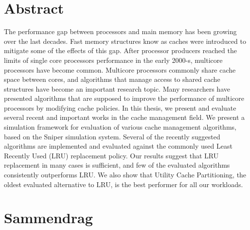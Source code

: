 
\section*{Abstract}

The performance gap between processors and main memory has been growing over the last decades.
Fast memory structures know as caches were introduced to mitigate some of the effects of this gap.
After processor producers reached the limits of single core processors performance in the early 2000-s, multicore processors have become common.
Multicore processors commonly share cache space between cores, and algorithms that manage access to shared cache structures have become an important research topic.
Many researchers have presented algorithms that are supposed to improve the performance of multicore processors by modifying cache policies.
In this thesis, we present and evaluate several recent and important works in the cache management field.
We present a simulation framework for evaluation of various cache management algorithms, based on the Sniper simulation system.
Several of the recently suggested algorithms are implemented and evaluated against the commonly used Least Recently Used (LRU) replacement policy.
Our results suggest that LRU replacement in many cases is sufficient, and few of the evaluated algorithms consistently outperforms LRU.
We also show that Utility Cache Partitioning, the oldest evaluated alternative to LRU, is the best performer for all our workloads.

\clearpage

\section*{Sammendrag}

\clearpage